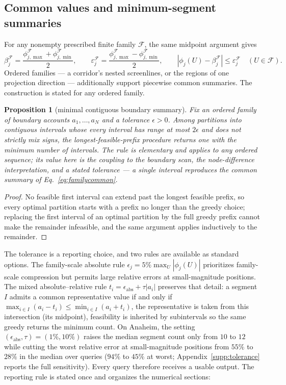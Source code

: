 \documentclass[a4paper,fleqn]{cas-sc}
\newtheorem{proposition}[theorem]{Proposition}
\begin{document}
\subsection{Common values and minimum-segment summaries}\label{sec:segments}
For any nonempty prescribed finite family $\mathcal F$, the same midpoint argument gives
\begin{equation}
\beta_j^{\mathcal F}=\frac{\phi_{j,\max}^{\mathcal F}+\phi_{j,\min}^{\mathcal F}}2,
\qquad \varepsilon_j^{\mathcal F}=\frac{\phi_{j,\max}^{\mathcal F}-\phi_{j,\min}^{\mathcal F}}2,
\qquad |\phi_j(U)-\beta_j^{\mathcal F}|\le\varepsilon_j^{\mathcal F}\quad(U\in\mathcal F).
\label{eq:familycommon}
\end{equation}
Ordered families --- a corridor's nested screenlines, or the regions of
one projection direction --- additionally support piecewise common
summaries. The construction is stated for any ordered family.
\begin{proposition}[minimal contiguous boundary summary]\label{prop:segmented}
Fix an ordered family of boundary accounts $a_1,\ldots,a_N$ and a
tolerance $\epsilon>0$. Among partitions into contiguous intervals
whose every interval has range at most $2\epsilon$ and does not
strictly mix signs, the longest-feasible-prefix procedure returns one
with the minimum number of intervals. The rule is elementary and
applies to any ordered sequence; its value here is the coupling to the
boundary scan, the node-difference interpretation, and a stated
tolerance --- a single interval reproduces the common summary of
Eq.~\eqref{eq:familycommon}.
\end{proposition}
\begin{proof}
No feasible first interval can extend past the longest feasible prefix,
so every optimal partition starts with a prefix no longer than the
greedy choice; replacing the first interval of an optimal partition by
the full greedy prefix cannot make the remainder infeasible, and the
same argument applies inductively to the remainder.
\end{proof}
The tolerance is a reporting choice, and two rules are available as
standard options. The family-scale absolute rule
$\epsilon_j=5\%\max_U|\phi_j(U)|$ prioritizes family-scale compression
but permits large relative errors at small-magnitude positions. The
mixed absolute--relative rule
$t_i=\epsilon_{\mathrm{abs}}+\tau|a_i|$ preserves that detail: a
segment $I$ admits a common representative value if and only if
$\max_{i\in I}(a_i-t_i)\le\min_{i\in I}(a_i+t_i)$, the representative
is taken from this intersection (its midpoint), feasibility is
inherited by subintervals so the same greedy returns the minimum
count. On Anaheim, the setting
$(\epsilon_{\mathrm{abs}},\tau)=(1\%,10\%)$ raises the median segment
count only from $10$ to $12$ while cutting the worst relative error at
small-magnitude positions from $55\%$ to $28\%$ in the median over
queries ($94\%$ to $45\%$ at worst; Appendix~\ref{supp:tolerance}
reports the full sensitivity).
Every query therefore receives a usable output. The reporting rule is
stated once and organizes the numerical sections:
\end{document}
